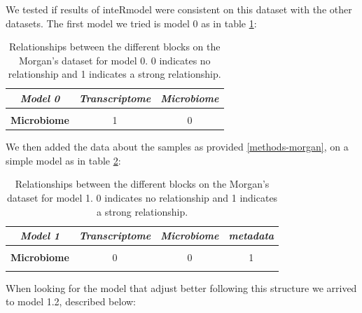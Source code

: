 \documentclass[
  12pt,
  a4paper,
  twoside,
  openright]{book}
\begin{document}
We tested if results of inteRmodel were consistent on this dataset with the other datasets.
The first model we tried is model 0 as in table \ref{tab:morgan-model0}:

\begin{table}[H]

\caption[Model 0 of the Morgan's dataset.]{\label{tab:morgan-model0}Relationships between the different blocks on the Morgan's dataset for model 0. 0 indicates no relationship and 1 indicates a strong relationship.}
\centering
\begin{tabular}[t]{|>{}c|c|>{}c|}
\hline
\em{\textbf{Model 0}} & \em{\textbf{Transcriptome}} & \em{\textbf{Microbiome}}\\
\hline
\textbf{\cellcolor{gray!6}{Transcriptome}} & \cellcolor{gray!6}{0} & \cellcolor{gray!6}{1}\\
\hline
\textbf{Microbiome} & 1 & 0\\
\hline
\end{tabular}
\end{table}

We then added the data about the samples as provided \ref{methods-morgan}, on a simple model as in table \ref{tab:morgan-model1}:

\begin{table}[H]

\caption[Model 1 of the Morgan's dataset.]{\label{tab:morgan-model1}Relationships between the different blocks on the Morgan's dataset for model 1. 0 indicates no relationship and 1 indicates a strong relationship.}
\centering
\begin{tabular}[t]{|>{}c|c|c|>{}c|}
\hline
\em{\textbf{Model 1}} & \em{\textbf{Transcriptome}} & \em{\textbf{Microbiome}} & \em{\textbf{metadata}}\\
\hline
\textbf{\cellcolor{gray!6}{Transcriptome}} & \cellcolor{gray!6}{0} & \cellcolor{gray!6}{0} & \cellcolor{gray!6}{1}\\
\hline
\textbf{Microbiome} & 0 & 0 & 1\\
\hline
\textbf{\cellcolor{gray!6}{metadata}} & \cellcolor{gray!6}{1} & \cellcolor{gray!6}{1} & \cellcolor{gray!6}{0}\\
\hline
\end{tabular}
\end{table}

When looking for the model that adjust better following this structure we arrived to model 1.2, described below:
\end{document}
